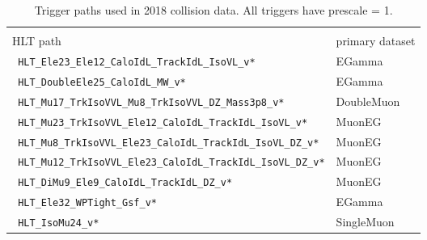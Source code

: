 \begin{table*}
  \caption{Trigger paths used in 2018 collision data. All triggers have prescale = 1.}
  \label{tab:triggerpaths2018}
  \scriptsize
  \centering
  \begin{tabular}{ l l }
    \toprule %
    \shortstack{{}\\[.15ex] \normalsize{HLT path}}                & \normalsize{primary dataset} \\
    \midrule %
    \verb| HLT_Ele23_Ele12_CaloIdL_TrackIdL_IsoVL_v*            | & EGamma \\
    \verb| HLT_DoubleEle25_CaloIdL_MW_v*                        | & EGamma \\
    \verb| HLT_Mu17_TrkIsoVVL_Mu8_TrkIsoVVL_DZ_Mass3p8_v*       | & DoubleMuon \\
    \verb| HLT_Mu23_TrkIsoVVL_Ele12_CaloIdL_TrackIdL_IsoVL_v*   | & MuonEG \\
    \verb| HLT_Mu8_TrkIsoVVL_Ele23_CaloIdL_TrackIdL_IsoVL_DZ_v* | & MuonEG \\
    \verb| HLT_Mu12_TrkIsoVVL_Ele23_CaloIdL_TrackIdL_IsoVL_DZ_v*| & MuonEG \\
    \verb| HLT_DiMu9_Ele9_CaloIdL_TrackIdL_DZ_v*                | & MuonEG \\
    \verb| HLT_Ele32_WPTight_Gsf_v*                             | & EGamma \\
    \verb| HLT_IsoMu24_v*                                       | & SingleMuon \\
    \bottomrule %
  \end{tabular}
\end{table*}
